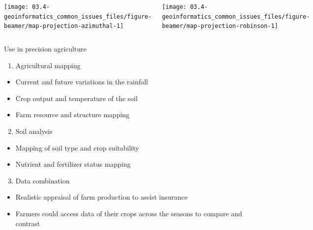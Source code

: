 \documentclass[11pt,dvipsnames,ignorenonframetext,aspectratio=169]{beamer}
\providecommand{\tightlist}{%
  \setlength{\itemsep}{0pt}\setlength{\parskip}{0pt}}
\begin{document}
\begin{frame}{}
\protect\hypertarget{section-7}{}
\begin{columns}


\texttt{[image: 03.4-geoinformatics\_common\_issues\_files/figure-beamer/map-projection-azimuthal-1]} 



\texttt{[image: 03.4-geoinformatics\_common\_issues\_files/figure-beamer/map-projection-robinson-1]} 

\end{columns}
\end{frame}

\begin{frame}{Use in precision agriculture}
\protect\hypertarget{use-in-precision-agriculture}{}
\begin{enumerate}
\tightlist
\item
  Agricultural mapping
\end{enumerate}

\begin{itemize}
\tightlist
\item
  Current and future variations in the rainfall
\item
  Crop output and temperature of the soil
\item
  Farm resource and structure mapping
\end{itemize}

\begin{enumerate}
\setcounter{enumi}{1}
\tightlist
\item
  Soil analysis
\end{enumerate}

\begin{itemize}
\tightlist
\item
  Mapping of soil type and crop suitability
\item
  Nutrient and fertilizer status mapping
\end{itemize}

\begin{enumerate}
\setcounter{enumi}{2}
\tightlist
\item
  Data combination
\end{enumerate}

\begin{itemize}
\tightlist
\item
  Realistic appraisal of farm production to assist insurance
\item
  Farmers could access data of their crops across the seasons to compare
  and contrast
\end{itemize}
\end{frame}
\end{document}
